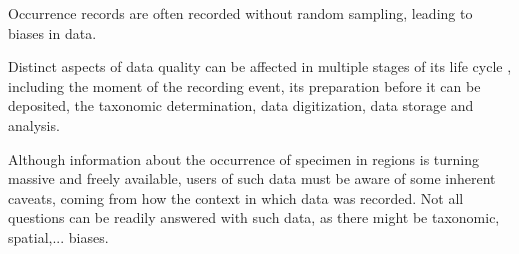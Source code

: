 Occurrence records are often recorded without random sampling, leading to biases in data.


Distinct aspects of data quality can be affected in multiple stages of its life cycle \cite{Chapman2005}, including the moment of the recording event, its preparation before it can be deposited, the taxonomic determination, data digitization, data storage and analysis.


 


Although information about the occurrence of specimen in regions is turning massive and freely available, users of such data must be aware of some inherent caveats, coming from how the context in which data was recorded. 
Not all questions can be readily answered with such data, as there might be taxonomic, spatial,... biases.














